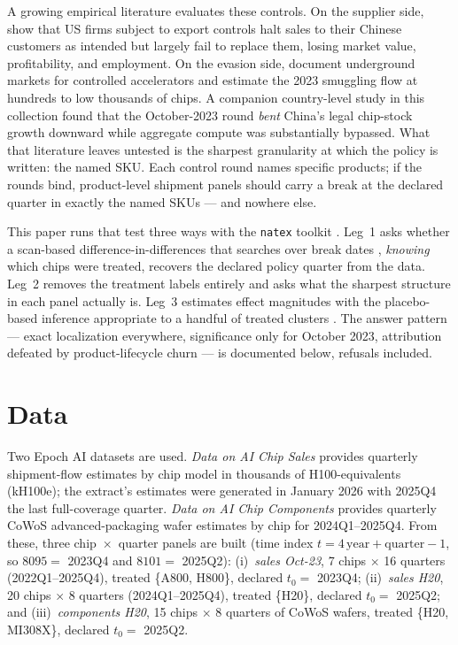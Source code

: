 \documentclass[11pt]{article}
\newcommand{\natex}{\texttt{natex}}
\begin{document}
A growing empirical literature evaluates these controls. On the supplier
side, \cite{crosignani2025} show that US firms subject to export controls
halt sales to their Chinese customers as intended but largely fail to replace
them, losing market value, profitability, and employment. On the evasion
side, \cite{fist2023} document underground markets for controlled
accelerators and estimate the 2023 smuggling flow at hundreds to low
thousands of chips. A companion country-level study in this collection
\cite{hillebrandt2026legs} found that the October-2023 round \emph{bent}
China's legal chip-stock growth downward while aggregate compute was
substantially bypassed. What that literature leaves untested is the sharpest
granularity at which the policy is written: the named SKU. Each control round
names specific products; if the rounds bind, product-level shipment panels
should carry a break at the declared quarter in exactly the named SKUs ---
and nowhere else.

This paper runs that test three ways with the \natex{} toolkit \cite{natex}.
Leg~1 asks whether a scan-based difference-in-differences that searches over
break dates \cite{herlands2018}, \emph{knowing} which chips were treated,
recovers the declared policy quarter from the data. Leg~2 removes the
treatment labels entirely and asks what the sharpest structure in each panel
actually is. Leg~3 estimates effect magnitudes with the placebo-based
inference appropriate to a handful of treated clusters
\cite{conleytaber2011,cameron2015}. The answer pattern --- exact localization
everywhere, significance only for October 2023, attribution defeated by
product-lifecycle churn --- is documented below, refusals included.

\section{Data}\label{sec:data}

Two Epoch AI datasets are used. \emph{Data on AI Chip Sales}
\cite{epochchipsales} provides quarterly shipment-flow estimates by chip
model in thousands of H100-equivalents (kH100e); the extract's estimates
were generated in January 2026 with 2025Q4 the last full-coverage quarter.
\emph{Data on AI Chip Components} \cite{epochchipcomponents} provides
quarterly CoWoS advanced-packaging wafer estimates by chip for
2024Q1--2025Q4. From these, three chip~$\times$~quarter panels are built
(time index $t=4\,\mathrm{year}+\mathrm{quarter}-1$, so $8095=$ 2023Q4 and
$8101=$ 2025Q2): (i)~\emph{sales Oct-23}, 7 chips $\times$ 16 quarters
(2022Q1--2025Q4), treated \{A800, H800\}, declared $t_0=$ 2023Q4;
(ii)~\emph{sales H20}, 20 chips $\times$ 8 quarters (2024Q1--2025Q4),
treated \{H20\}, declared $t_0=$ 2025Q2; and (iii)~\emph{components H20}, 15
chips $\times$ 8 quarters of CoWoS wafers, treated \{H20, MI308X\}, declared
$t_0=$ 2025Q2.
\end{document}
